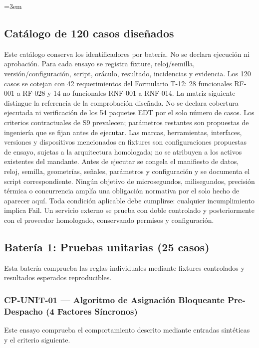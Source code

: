 \begingroup
\makeatletter
{}
\makeatother
\emergencystretch=3em
\sloppy
\subsection*{Catálogo de 120 casos diseñados}\label{sec:9-catalogo}
Este catálogo conserva los identificadores por batería. No se declara ejecución ni aprobación. Para cada ensayo se registra fixture, reloj/semilla, versión/configuración, script, oráculo, resultado, incidencias y evidencia. Los 120 casos se cotejan con 42 requerimientos del Formulario T-12: 28 funcionales RF-001 a RF-028 y 14 no funcionales RNF-001 a RNF-014. La matriz siguiente distingue la referencia de la comprobación diseñada. No se declara cobertura ejecutada ni verificación de los 54 paquetes EDT por el solo número de casos. Los criterios contractuales de S9 prevalecen; parámetros restantes son propuestas de ingeniería que se fijan antes de ejecutar. Las marcas, herramientas, interfaces, versiones y dispositivos mencionados en fixtures son configuraciones propuestas de ensayo, sujetas a la arquitectura homologada; no se atribuyen a los activos existentes del mandante. Antes de ejecutar se congela el manifiesto de datos, reloj, semilla, geometrías, señales, parámetros y configuración y se documenta el script correspondiente. Ningún objetivo de microsegundos, milisegundos, precisión térmica o concurrencia amplía una obligación normativa por el solo hecho de aparecer aquí. Toda condición aplicable debe cumplirse: cualquier incumplimiento implica Fail. Un servicio externo se prueba con doble controlado y posteriormente con el proveedor homologado, conservando permisos y configuración.




\subsection*{Batería 1: Pruebas unitarias (25 casos)}
Esta batería comprueba las reglas individuales mediante fixtures controlados y resultados esperados reproducibles.

\subsubsection*{CP-UNIT-01 — Algoritmo de Asignación Bloqueante Pre-Despacho (4 Factores Síncronos)}\label{sec:9-cp-unit-01}
Este ensayo comprueba el comportamiento descrito mediante entradas sintéticas y el criterio siguiente.

